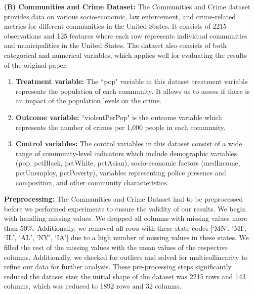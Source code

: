 \textbf{(B) Communities and Crime Dataset:} The Communities and Crime dataset provides data on various socio-economic, law enforcement, and crime-related metrics for different communities in the United States. It consists of 2215 observations and 125 features where each row represents individual communities and municipalities in the United States. The dataset also consists of both categorical and numerical variables, which applies well for evaluating the results of the original paper. 
\begin{enumerate}
    \item \textbf{Treatment variable:} The ``pop" variable in this dataset treatment variable represents the population of each community. It allows us to assess if there is an impact of the population levels on the crime. 
    \item \textbf{Outcome variable:} ``violentPerPop" is the outcome variable which represents the number of crimes per 1,000 people in each community.
    \item \textbf{Control variables:} The control variables in this dataset consist of a wide range of community-level indicators which include demographic variables (pop, pctBlack, pctWhite, pctAsian), socio-economic factors (medIncome, pctUnemploy, pctPoverty), variables representing police presence and composition, and other community characteristics.
\end{enumerate}

\textbf{Preprocessing:} The Communities and Crime Dataset had to be preprocessed before we performed experiments to ensure the validity of our results. We begin with handling missing values. We dropped all columns with missing values more than 50\%. Additionally, we removed all rows with these state codes [`MN', `MI', `IL', `AL', `NY', `IA'] due to a high number of missing values in these states. We filled the rest of the missing values with the mean values of the respective columns. Additionally, we checked for outliers and solved for multicollinearity to refine our data for further analysis. These pre-processing steps significantly reduced the dataset size; the initial shape of the dataset was 2215 rows and 143 columns, which was reduced to 1892 rows and 32 columns.